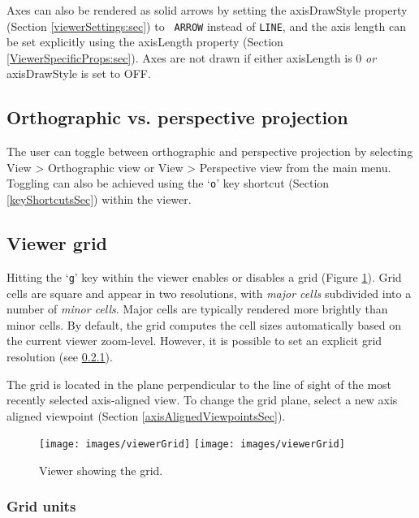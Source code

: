 \documentclass{article}
\begin{document}
Axes can also be rendered as solid arrows by setting the {\sf
axisDrawStyle} property (Section \ref{viewerSettings:sec}) to {\tt
ARROW} instead of {\tt LINE}, and the axis length can be set
explicitly using the {\sf axisLength} property (Section
\ref{ViewerSpecificProps:sec}). Axes are not drawn if either {\sf
axisLength} is 0 {\it or} {\sf axisDrawStyle} is set to {\sf OFF}.

\subsection{Orthographic vs. perspective projection}
\label{ProjectionSec}

The user can toggle between orthographic and perspective projection by
selecting {\sf View > Orthographic view} or {\sf View > Perspective
view} from the main menu. Toggling can also be achieved using the
`{\tt o}' key shortcut (Section \ref{keyShortcutsSec}) within the
viewer.

\subsection{Viewer grid}
\label{ViewerGrid}

Hitting the `{\tt g}' key within the viewer enables or disables a grid
(Figure \ref{viewerGridFig}). Grid cells are square and appear in two
resolutions, with {\it major cells} subdivided into a number of {\it
minor cells}. Major cells are typically rendered more brightly than
minor cells. By default, the grid computes the cell sizes
automatically based on the current viewer zoom-level. However, it is
possible to set an explicit grid resolution (see
\ref{GridUnits}).

The grid is located in the plane perpendicular to the line of sight of
the most recently selected axis-aligned view. To change the grid
plane, select a new axis aligned viewpoint (Section
\ref{axisAlignedViewpointsSec}).

\begin{figure}
\begin{center}
\iflatexml
\texttt{[image: images/viewerGrid]}
\else
\texttt{[image: images/viewerGrid]}
\fi
\end{center}
\caption{Viewer showing the grid.}%
\label{viewerGridFig}
\end{figure}

\subsubsection{Grid units}
\label{GridUnits}
\end{document}
